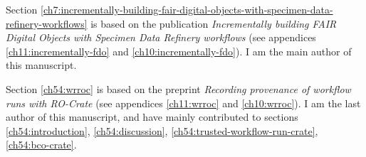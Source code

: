 Section \ref{ch7:incrementally-building-fair-digital-objects-with-specimen-data-refinery-workflows} is based on the publication \emph{Incrementally building FAIR Digital Objects with Specimen Data
Refinery workflows} \cite{Woolland 2022} (see appendices \ref{ch11:incrementally-fdo} and \ref{ch10:incrementally-fdo}). I am the main author of this manuscript.

Section \ref{ch54:wrroc} is based on the preprint \emph{
Recording provenance of workflow runs with RO-Crate} \cite{Leo 2023b} (see appendices \ref{ch11:wrroc} and \ref{ch10:wrroc}). I am the last author of this manuscript, and have mainly contributed to sections \ref{ch54:introduction}, \ref{ch54:discussion}, \ref{ch54:trusted-workflow-run-crate}, \ref{ch54:bco-crate}.
